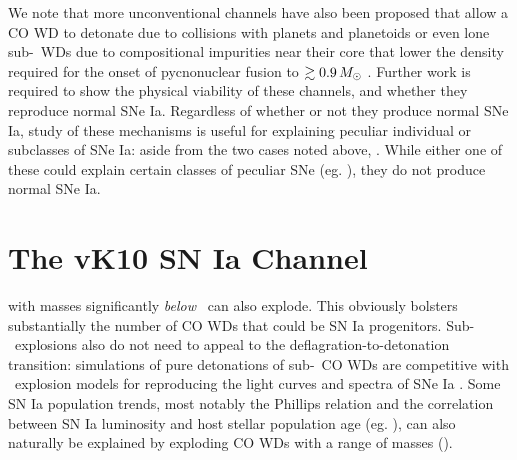 We note that more unconventional channels have also been proposed that allow a CO WD to detonate due to collisions with planets and planetoids \citep{distfg15} or even lone sub-\Mch\ WDs due to compositional impurities near their core that lower the density required for the onset of pycnonuclear fusion to $\gtrsim0.9\,\Msun$ \citep{chio+15}.  Further work is required to show the physical viability of these channels, and whether they reproduce normal SNe Ia.  Regardless of whether or not they produce normal SNe Ia, study of these mechanisms is useful for explaining peculiar individual or subclasses of SNe Ia: aside from the two cases noted above, .  While either one of these could explain certain classes of peculiar SNe (eg. \citealt{fink+14, fishj15}), they do not produce normal SNe Ia.  

\section{The vK10 SN Ia Channel}

 with masses significantly \textit{below} \Mch\ can also explode.  This obviously bolsters substantially the number of CO WDs that could be SN Ia progenitors.  Sub-\Mch\ explosions also do not need to appeal to the deflagration-to-detonation transition: simulations of pure detonations of sub-\Mch\ CO WDs \citep{shig+92, sim+10} are competitive with \Mch\ explosion models for reproducing the light curves and spectra of SNe Ia \citep{none}.  Some SN Ia population trends, most notably the Phillips relation and the correlation between SN Ia luminosity and host stellar population age (eg. \cite{none}), can also naturally be explained by exploding CO WDs with a range of masses (\citeal{vkercj10}).



